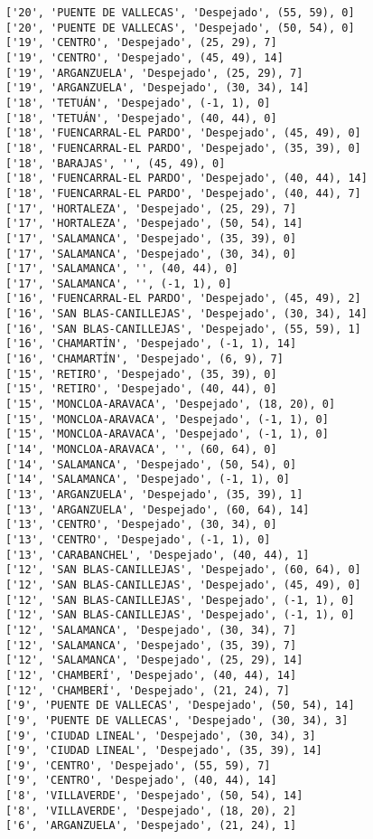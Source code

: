 \documentclass[11pt]{article}
\begin{document}
\begin{Verbatim}[commandchars=\\\{\}]
['20', 'PUENTE DE VALLECAS', 'Despejado', (55, 59), 0]
['20', 'PUENTE DE VALLECAS', 'Despejado', (50, 54), 0]
['19', 'CENTRO', 'Despejado', (25, 29), 7]
['19', 'CENTRO', 'Despejado', (45, 49), 14]
['19', 'ARGANZUELA', 'Despejado', (25, 29), 7]
['19', 'ARGANZUELA', 'Despejado', (30, 34), 14]
['18', 'TETUÁN', 'Despejado', (-1, 1), 0]
['18', 'TETUÁN', 'Despejado', (40, 44), 0]
['18', 'FUENCARRAL-EL PARDO', 'Despejado', (45, 49), 0]
['18', 'FUENCARRAL-EL PARDO', 'Despejado', (35, 39), 0]
['18', 'BARAJAS', '', (45, 49), 0]
['18', 'FUENCARRAL-EL PARDO', 'Despejado', (40, 44), 14]
['18', 'FUENCARRAL-EL PARDO', 'Despejado', (40, 44), 7]
['17', 'HORTALEZA', 'Despejado', (25, 29), 7]
['17', 'HORTALEZA', 'Despejado', (50, 54), 14]
['17', 'SALAMANCA', 'Despejado', (35, 39), 0]
['17', 'SALAMANCA', 'Despejado', (30, 34), 0]
['17', 'SALAMANCA', '', (40, 44), 0]
['17', 'SALAMANCA', '', (-1, 1), 0]
['16', 'FUENCARRAL-EL PARDO', 'Despejado', (45, 49), 2]
['16', 'SAN BLAS-CANILLEJAS', 'Despejado', (30, 34), 14]
['16', 'SAN BLAS-CANILLEJAS', 'Despejado', (55, 59), 1]
['16', 'CHAMARTÍN', 'Despejado', (-1, 1), 14]
['16', 'CHAMARTÍN', 'Despejado', (6, 9), 7]
['15', 'RETIRO', 'Despejado', (35, 39), 0]
['15', 'RETIRO', 'Despejado', (40, 44), 0]
['15', 'MONCLOA-ARAVACA', 'Despejado', (18, 20), 0]
['15', 'MONCLOA-ARAVACA', 'Despejado', (-1, 1), 0]
['15', 'MONCLOA-ARAVACA', 'Despejado', (-1, 1), 0]
['14', 'MONCLOA-ARAVACA', '', (60, 64), 0]
['14', 'SALAMANCA', 'Despejado', (50, 54), 0]
['14', 'SALAMANCA', 'Despejado', (-1, 1), 0]
['13', 'ARGANZUELA', 'Despejado', (35, 39), 1]
['13', 'ARGANZUELA', 'Despejado', (60, 64), 14]
['13', 'CENTRO', 'Despejado', (30, 34), 0]
['13', 'CENTRO', 'Despejado', (-1, 1), 0]
['13', 'CARABANCHEL', 'Despejado', (40, 44), 1]
['12', 'SAN BLAS-CANILLEJAS', 'Despejado', (60, 64), 0]
['12', 'SAN BLAS-CANILLEJAS', 'Despejado', (45, 49), 0]
['12', 'SAN BLAS-CANILLEJAS', 'Despejado', (-1, 1), 0]
['12', 'SAN BLAS-CANILLEJAS', 'Despejado', (-1, 1), 0]
['12', 'SALAMANCA', 'Despejado', (30, 34), 7]
['12', 'SALAMANCA', 'Despejado', (35, 39), 7]
['12', 'SALAMANCA', 'Despejado', (25, 29), 14]
['12', 'CHAMBERÍ', 'Despejado', (40, 44), 14]
['12', 'CHAMBERÍ', 'Despejado', (21, 24), 7]
['9', 'PUENTE DE VALLECAS', 'Despejado', (50, 54), 14]
['9', 'PUENTE DE VALLECAS', 'Despejado', (30, 34), 3]
['9', 'CIUDAD LINEAL', 'Despejado', (30, 34), 3]
['9', 'CIUDAD LINEAL', 'Despejado', (35, 39), 14]
['9', 'CENTRO', 'Despejado', (55, 59), 7]
['9', 'CENTRO', 'Despejado', (40, 44), 14]
['8', 'VILLAVERDE', 'Despejado', (50, 54), 14]
['8', 'VILLAVERDE', 'Despejado', (18, 20), 2]
['6', 'ARGANZUELA', 'Despejado', (21, 24), 1]

\end{Verbatim}
\end{document}
